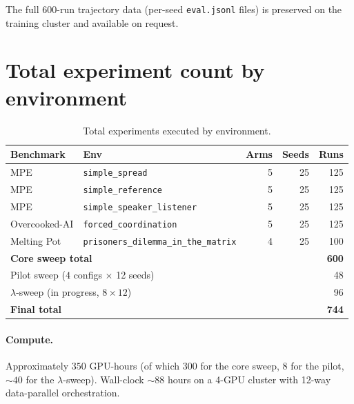 \documentclass[11pt,a4paper]{article}
\begin{document}
The full $600$-run trajectory data (per-seed \texttt{eval.jsonl} files) is preserved on the training cluster
and available on request.

\section{Total experiment count by environment}\label{app:counts}

\begin{table}[h]
\centering
\caption{Total experiments executed by environment.}
\label{tab:counts}
\begin{tabular}{llrrr}
\toprule
\textbf{Benchmark} & \textbf{Env} & \textbf{Arms} & \textbf{Seeds} & \textbf{Runs} \\
\midrule
MPE             & \texttt{simple\_spread}                    & 5 & 25 & 125 \\
MPE             & \texttt{simple\_reference}                 & 5 & 25 & 125 \\
MPE             & \texttt{simple\_speaker\_listener}         & 5 & 25 & 125 \\
Overcooked-AI   & \texttt{forced\_coordination}              & 5 & 25 & 125 \\
Melting Pot     & \texttt{prisoners\_dilemma\_in\_the\_matrix} & 4 & 25 & 100 \\
\midrule
\multicolumn{4}{l}{\textbf{Core sweep total}}                  & \textbf{600} \\
\multicolumn{4}{l}{Pilot sweep ($4$ configs $\times$ 12 seeds)} & 48 \\
\multicolumn{4}{l}{$\lambda$-sweep (in progress, $8 \times 12$)} & 96 \\
\midrule
\multicolumn{4}{l}{\textbf{Final total}}                        & \textbf{744} \\
\bottomrule
\end{tabular}
\end{table}

\paragraph{Compute.}
Approximately $350$ GPU-hours (of which $300$ for the core sweep, $8$ for the pilot, $\sim 40$ for the $\lambda$-sweep).
Wall-clock $\sim 88$ hours on a 4-GPU cluster with 12-way data-parallel orchestration.
\end{document}
